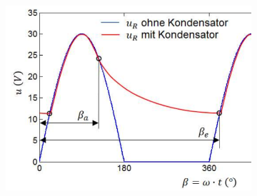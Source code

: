 \begin{figure}[h]
\begin{subfigure}[t]{0.24\linewidth}
\end{subfigure}
\begin{subfigure}[t]{0.25\linewidth}
    \includegraphics[width=\linewidth]{images/M1URCKl}
\end{subfigure}
\end{figure}
\vspace{-0.8cm}
